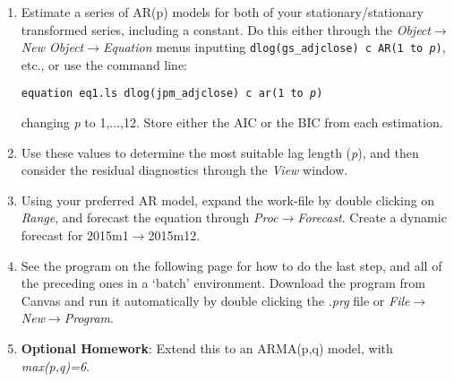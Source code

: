 \documentclass[a4paper,11pt]{article}
\begin{document}
\begin{enumerate}
\item Estimate a series of AR(p) models for both of your stationary/stationary transformed series, including a constant. Do this either through the \emph{Object}$\rightarrow$\emph{New Object}$\rightarrow$\emph{Equation} menus inputting \texttt{dlog(gs\_adjclose) c AR(1 to \emph{p})}, etc., or use the command line:
\begin{center}
\texttt{equation eq1.ls dlog(jpm\_adjclose) c ar(1 to \emph{p})}
\end{center}
changing \emph{p} to 1,$\hdots$,12. Store either the AIC or the BIC from each estimation.
\item Use these values to determine the most suitable lag length (\emph{p}), and then consider the residual diagnostics through the \emph{View} window.
\item Using your preferred AR model, expand the work-file by double clicking on \emph{Range}, and forecast the equation through \emph{Proc}$\rightarrow$\emph{Forecast}. Create a dynamic forecast for 2015m1$\rightarrow$2015m12.
\item See the program on the following page for how to do the last step, and all of the preceding ones in a `batch' environment. Download the program from Canvas and run it automatically by double clicking the \emph{.prg} file or \emph{File}$\rightarrow$\emph{New}$\rightarrow$\emph{Program}.
\item \textbf{Optional Homework}: Extend this to an ARMA(p,q) model, with \emph{max(p,q)=6}.
\end{enumerate}
\newpage
\end{document}
